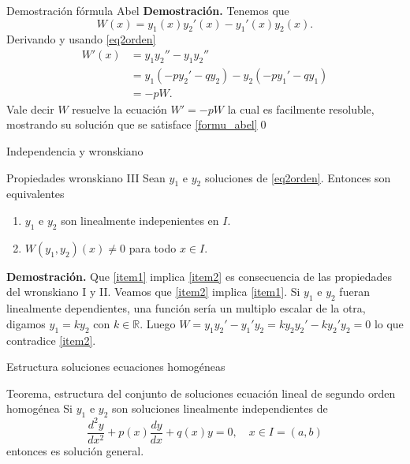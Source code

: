 \documentclass[handout,hyperref={colorlinks=true}]{beamer}
\newcommand{\rr}{\mathbb{R}}
\newcommand{\nl}{\onslide<+-> }
\begin{document}
\begin{frame}{Demostración fórmula Abel}
\textbf{Demostración.} Tenemos que 
\[W(x)=y_1(x)y_2'(x)-y_1'(x)y_2(x).\]
Derivando y usando \eqref{eq2orden}
\[\begin{split}W'(x)&=y_1y_2''-y_1y_2''\\
   &=y_1(-py_2'-qy_2)-y_2(-py_1'-qy_1)\\
   &=-pW.
  \end{split}
\]
Vale decir $W$ resuelve la ecuación $W'=-pW$ la cual es facilmente resoluble, mostrando su solución que se satisface \eqref{formu_abel}\qed 


\end{frame}
 
 
\begin{frame}{Independencia y wronskiano}
\nl\begin{block}{Propiedades wronskiano III}
 Sean $y_1$ e $y_2$ soluciones de \eqref{eq2orden}. Entonces son equivalentes
 \begin{enumerate}
  \item\label{item1} $y_1$ e $y_2$ son linealmente indepenientes en $I$. 
  \item\label{item2} $W(y_1,y_2)(x)\neq 0$ para todo $x\in I$.
 \end{enumerate}
\end{block}
\nl\textbf{Demostración.}  Que \ref{item1} implica \ref{item2} es consecuencia de las propiedades del wronskiano I y II. 
Veamos que \ref{item2} implica \ref{item1}. Si $y_1$ e $y_2$ fueran linealmente dependientes, una función sería un multiplo escalar de la otra, digamos
$y_1=ky_2$ con $k\in\rr$. Luego $W=y_1y_2'-y_1'y_2=ky_2y_2'-ky_2'y_2=0$ lo que contradice \ref{item2}.

\end{frame} 
 
\begin{frame}{Estructura soluciones ecuaciones homogéneas}
\begin{block}{Teorema, estructura del conjunto de soluciones ecuación lineal de segundo orden homogénea}
Si $y_1$ e $y_2$ son soluciones linealmente independientes de 
\[\frac{d^2y}{dx^2}+p(x)\frac{dy}{dx}+q(x)y=0,\quad x\in I=(a,b)\]
entonces
es solución general.
\end{block}

\end{frame}
\end{document}
